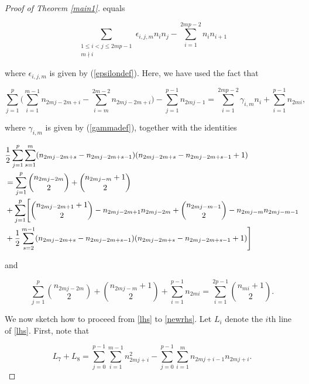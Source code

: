 \documentclass[11pt,reqno]{amsart}
\theoremstyle{definition}
\numberwithin{equation}{section}
\begin{document}
\begin{proof}[Proof of Theorem \ref{main1}]
\noindent equals

\begin{equation} \label{newrhs}
\displaystyle{\sum_{\substack{1 \leq i < j \leq 2mp-1 \\ m \nmid i}} \epsilon_{i,j,m} n_i n_j} - \displaystyle \sum_{i=1}^{2mp-2} n_i n_{i+1}
\end{equation} 

\noindent where $\epsilon_{i,j,m}$ is given by (\ref{epsilondef}). Here, we have used the fact that

\begin{equation} \label{s1}
\sum_{j=1}^{p} \Biggl( \sum_{i=1}^{m-1} n_{2mj - 2m + i} - \sum_{i=m}^{2m-2} n_{2mj - 2m+i} \Biggr) - \sum_{j=1}^{p-1} n_{2mj-1} =  \sum_{i=1}^{2mp-2} \gamma_{i,m} n_i + \sum_{i=1}^{p-1} n_{2mi},
\end{equation}

\noindent where $\gamma_{i,m}$ is given by (\ref{gammadef}), together with the identities

\begin{equation} \label{s2}
\begin{aligned}
& \frac{1}{2} \sum_{j=1}^{p} \sum_{s=1}^{m} (n_{2mj-2m+s} - n_{2mj-2m+s-1})(n_{2mj-2m+s} - n_{2mj-2m+s-1} + 1) \\
& = \sum_{j=1}^{p} \binom{n_{2mj - 2m}}{2} + \binom{n_{2mj-m} + 1}{2} \\
& + \sum_{j=1}^{p} \Biggl[ \binom{n_{2mj-2m+1} + 1}{2} - n_{2mj-2m+1} n_{2mj-2m} + \binom{n_{2mj-m-1}}{2} - n_{2mj-m} n_{2mj-m-1} \\
& + \frac{1}{2} \sum_{s=2}^{m-1} (n_{2mj-2m+s} - n_{2mj-2m+s-1})(n_{2mj-2m+s} - n_{2mj-2m+s-1} + 1) \Biggr] \hphantom{xxxxxxxxxx}
\end{aligned}
\end{equation}

\noindent and

\begin{equation} \label{s3}
\sum_{j=1}^{p} \binom{n_{2mj - 2m}}{2} + \binom{n_{2mj-m} + 1}{2} + \sum_{i=1}^{p-1} n_{2mi}= \sum_{i=1}^{2p-1} \binom{n_{mi} + 1}{2}.
\end{equation}

We now sketch how to proceed from \eqref{lhs} to \eqref{newrhs}.  Let $L_{i}$ denote the $i$th line of \eqref{lhs}. First, note that

\begin{equation} \label{l7l8}
L_7 + L_8 = \sum_{j=0}^{p-1} \sum_{i=1}^{m-1} n_{2mj+i}^2 - \sum_{j=0}^{p-1} \sum_{i=1}^{m} n_{2mj+i-1}n_{2mj+i}.
\end{equation}


\end{proof}
\end{document}
